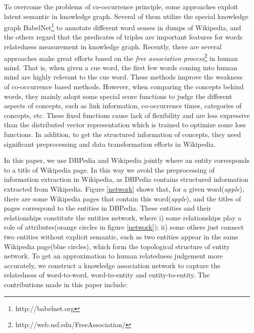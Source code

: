 To overcome the problems of co-occurrence principle, some approaches\cite{acl/IacobacciPN15,aaai/Pirro12} exploit latent semantic in knowledge graph.
Several of them utilize the special knowledge graph BabelNet\footnote{http://babelnet.org} to annotate different word senses
in dumps of Wikipedia, and the others regard that the predicates of triples are important features for words relatedness measurement in knowledge graph.
Recently, there are several approaches\cite{aaai/GongXH18,aaai/ZhangZH15} make great efforts based on the
\emph{free association process}\footnote{http://web.usf.edu/FreeAssociation/} in human mind. That is, when given a cue word, the first few words coming
into human mind are highly relevant to the cue word. These methods improve the weakness of co-occurrence based methods. However, when
comparing the concepts behind words, they mainly adopt some special score functions to judge the different aspects of concepts, such as
link information, co-occurrence times, categories of concepts, etc. These fixed functions cause lack of flexibility and
are less expressive than the distributed vector representation which is trained to optimize some loss functions. 
In addition, to get the structured information of concepts, they need significant preprocessing and data transformation efforts in Wikipedia.

In this paper, we use DBPedia and Wikipedia jointly where an entity corresponds to a title of Wikipedia page.
In this way we avoid the preprocessing of information extraction in Wikipedia, as DBPedia contains structured information extracted from Wikipedia.
Figure \ref{network} shows that, for a given word(\emph{apple}), there are some Wikipedia pages that contain this word(\emph{apple}),
and the titles of pages correspond to the entities in DBPedia. These entities and their relationships constitute the entities network,
where i) some relationships play a role of attributes(orange circles in figure \ref{network});
ii) some others just connect two entities without explicit semantic, such as two entities appear in the same Wikipedia page(blue circles),
which form the topological structure of entity network.
To get an approximation to human relatedness judgement more accurately,
we construct a knowledge association network to capture the relatedness of word-to-word, word-to-entity and
entity-to-entity. The contributions made in this paper include:

